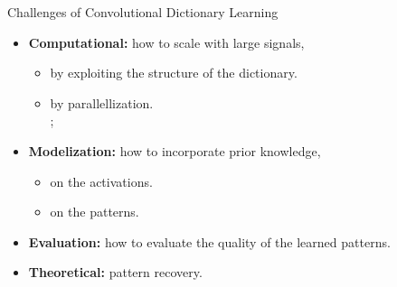 \documentclass[main_dicodile]{subfiles}
\begin{document}
\begin{frame}[t]{Challenges of Convolutional Dictionary Learning}
    \begin{itemize}\itemsep1em
        \item \textbf{Computational:} how to scale with large signals,
        \begin{itemize}
            \item by exploiting the structure of the dictionary.\\
            \item {by parallellization.}\\
            ;
        \end{itemize}
        \item \textbf{Modelization:} how to incorporate prior knowledge,
        \begin{itemize}
            \item on the activations.\\
            \item on the patterns.\\
        \end{itemize}
        \item \textbf{Evaluation:} how to evaluate the quality of the learned patterns.
        \item \textbf{Theoretical:} pattern recovery.
    \end{itemize}
\end{frame}

%
\end{document}
